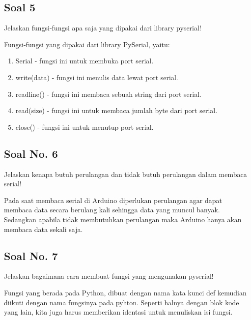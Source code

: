 \subsection{Soal 5}
Jelaskan fungsi-fungsi apa saja yang dipakai dari library pyserial!

\hfill \break
Fungsi-fungsi yang dipakai dari library PySerial, yaitu:
\begin{enumerate}
	\item Serial - fungsi ini untuk membuka port serial.
	\item write(data) - fungsi ini menulis data lewat port serial.
	\item readline() - fungsi ini membaca sebuah string dari port serial.
	\item read(size) - fungsi ini untuk membaca jumlah byte dari port serial.
	\item close() - fungsi ini untuk menutup port serial.
\end{enumerate}

\subsection{Soal No. 6}
Jelaskan kenapa butuh perulangan dan tidak butuh perulangan dalam membaca serial!

\hfill \break
Pada saat membaca serial di Arduino diperlukan perulangan agar dapat membaca data secara berulang kali sehingga data yang muncul banyak. Sedangkan apabila tidak membutuhkan perulangan maka Arduino hanya akan membaca data sekali saja.

\subsection{Soal No. 7}
Jelaskan bagaimana cara membuat fungsi yang mengunakan pyserial!

\hfill \break
Fungsi yang berada pada Python, dibuat dengan nama kata kunci def kemudian diikuti dengan nama fungsinya pada pyhton.
Seperti halnya dengan blok kode yang lain, kita juga harus memberikan identasi untuk menuliskan isi fungsi.
